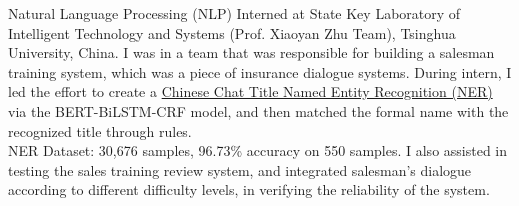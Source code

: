 \documentclass{my_cv}
\begin{document}
\hspace*{\fill} 

\workitemsthree
{Natural Language Processing (NLP) Interned at State Key Laboratory of Intelligent Technology and Systems (Prof. Xiaoyan Zhu Team), Tsinghua University, China.}
{I was in a team that was responsible for building a salesman training system, which was a piece of insurance dialogue systems. During intern, I led the effort to create a \href{https://github.com/SuperBruceJia/Chinese-Chat-Title-NER-BERT-BiLSTM-CRF}{Chinese Chat Title Named Entity Recognition (NER)} via the BERT-BiLSTM-CRF model, and then matched the formal name with the recognized title through rules. \\NER Dataset: 30,676 samples, 96.73\% accuracy on 550 samples.}
{I also assisted in testing the sales training review system, and integrated salesman’s dialogue according to different difficulty levels, in verifying the reliability of the system.}

\hspace*{\fill} 

%
%
%
%
\end{document}
